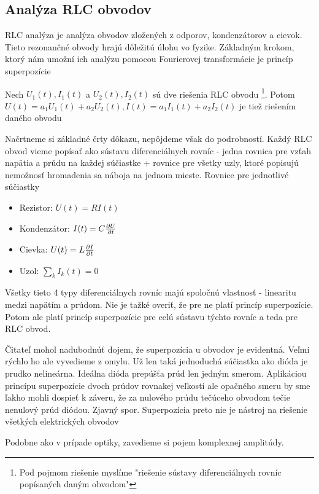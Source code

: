 \subsection{Analýza RLC obvodov}

RLC analýza je analýza obvodov zložených z odporov, kondenzátorov a
cievok. Tieto rezonančné obvody hrajú dôležitú úlohu vo fyzike.
Základným krokom, ktorý nám umožní ich analýzu pomocou Fourierovej
transformácie je princíp superpozície
\begin{veta}
 Nech $U_1(t), I_1(t)$ a $U_2(t), I_2(t)$ sú dve riešenia RLC obvodu
 \footnote{Pod pojmom riešenie myslíme "riešenie sústavy
 diferenciálnych rovníc popísaných daným obvodom"}.
 Potom $U(t)=a_1 U_1(t) + a_2 U_2(t), I(t)=a_1 I_1(t) + a_2 I_2(t)$ je
 tiež riešením daného obvodu
\end{veta}
\begin{dokaz}
    Načrtneme si základné črty dôkazu, nepôjdeme však do podrobností.
    Každý RLC obvod vieme popísať ako sústavu diferenciálnych rovníc - 
    jedna rovnica pre vzťah napätia a prúdu na každej súčiastke +
    rovnice pre všetky uzly, ktoré popisujú nemožnosť hromadenia sa
    náboja na jednom mieste.
    Rovnice pre jednotlivé súčiastky
    \begin{itemize}
        \item Rezistor: $U(t) = R I(t)$
        \item Kondenzátor: $I(t) = C \frac{\partial U}{\partial t}$
        \item Cievka: $U(t) = L \frac{\partial I}{\partial t}$
        \item Uzol: $\sum_{k} I_k(t) = 0$
    \end{itemize}
    Všetky tieto 4 typy diferenciálnych rovníc majú spoločnú vlastnosť
    - linearitu medzi napätím a prúdom. Nie je tažké overiť, že pre ne
      platí princíp superpozície. Potom ale platí princíp superpozície
      pre celú sústavu týchto rovníc a teda pre RLC obvod.
\end{dokaz}
\begin{poznamka}
    Čitateľ mohol nadubodnúť dojem, že superpozícia u obvodov je
    evidentná. Veľmi rýchlo ho ale vyvedieme z omylu. Už len taká
    jednoduchá súčiastka ako dióda je prudko nelineárna. Ideálna dióda
    prepúšťa prúd len jedným smerom. Aplikáciou princípu superpozície
    dvoch prúdov rovnakej veľkosti ale opačného smeru by sme ľakho
    mohli dospieť k záveru, že za nulového prúdu tečúceho obvodom
    tečie nenulový prúd diódou. Zjavný spor. Superpozícia preto nie je 
     nástroj na riešenie všetkých elektrických obvodov
\end{poznamka}

Podobne ako v prípade optiky, zavedieme si pojem komplexnej amplitúdy.

